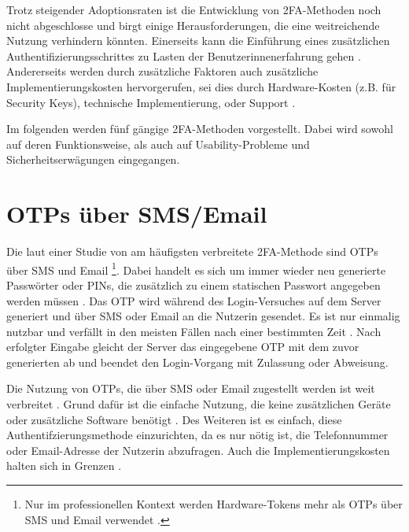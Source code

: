 Trotz steigender Adoptionsraten ist die Entwicklung von \ac{2FA}-Methoden noch nicht abgeschlosse und birgt einige Herausforderungen, die eine weitreichende Nutzung verhindern könnten. Einerseits kann die Einführung eines zusätzlichen Authentifizierungsschrittes zu Lasten der Benutzerinnenerfahrung gehen \parencite{decristofaroComparativeUsability2014}. Andererseits werden durch zusätzliche Faktoren auch zusätzliche Implementierungskosten hervorgerufen, sei dies durch Hardware-Kosten (z.B. für Security Keys), technische Implementierung, oder Support \parencite{alsaleemMultiFactorAuthentication2021}.

\pskip
Im folgenden werden fünf gängige \ac{2FA}-Methoden vorgestellt. Dabei wird sowohl auf deren Funktionsweise, als auch auf Usability-Probleme und Sicherheitserwägungen eingegangen.

\section{\acsp{OTP} über SMS/Email}
\label{sec:otp}

Die laut einer Studie von \citeyear{decristofaroComparativeUsability2014} am häufigsten verbreitete \ac{2FA}-Methode sind \aclp{OTP} über SMS und Email \parencite{decristofaroComparativeUsability2014}\footnote{Nur im professionellen Kontext werden Hardware-Tokens mehr als \acp{OTP} über SMS und Email verwendet \parencite{decristofaroComparativeUsability2014}.}. Dabei handelt es sich um immer wieder neu generierte Passwörter oder PINs, die zusätzlich zu einem statischen Passwort angegeben werden müssen \parencite{geramiOneTimePasswords2016}. Das \ac{OTP} wird während des Login-Versuches auf dem Server generiert und über \acs{SMS} oder Email an die Nutzerin gesendet. Es ist nur einmalig nutzbar und verfällt in den meisten Fällen nach einer bestimmten Zeit \parencite{geramiOneTimePasswords2016}. Nach erfolgter Eingabe gleicht der Server das eingegebene \ac{OTP} mit dem zuvor generierten ab und beendet den Login-Vorgang mit Zulassung oder Abweisung.

Die Nutzung von \acp{OTP}, die über SMS oder Email zugestellt werden ist weit verbreitet \parencite{decristofaroComparativeUsability2014}. Grund dafür ist die einfache Nutzung, die keine zusätzlichen Geräte oder zusätzliche Software benötigt \parencite{abhishekComprehensiveStudy2013}. Des Weiteren ist es einfach, diese Authentifzierungsmethode einzurichten, da es nur nötig ist, die Telefonnummer oder Email-Adresse der Nutzerin abzufragen. Auch die Implementierungskosten halten sich in Grenzen \parencite{abhishekComprehensiveStudy2013}.

